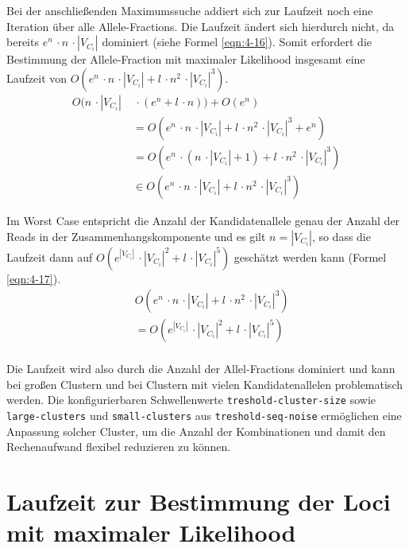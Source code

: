 Bei der anschließenden Maximumssuche addiert sich zur Laufzeit noch eine Iteration über alle Allele-Fractions. Die Laufzeit ändert sich hierdurch nicht, da bereits $e^n\, \cdotp n\, \cdotp |V_{C_{i}}|$ dominiert (siehe Formel \eqref{eqn:4-16}). Somit erfordert die Bestimmung der Allele-Fraction mit maximaler Likelihood insgesamt eine Laufzeit von $ O( e^n\, \cdotp n\, \cdotp |V_{C_{i}}| + l\, \cdotp n^2\, \cdotp |V_{C_{i}}|^3) $.
\begin{equation} \label{eqn:4-16}
\tag{4-16}
\begin{aligned}
 O( n \, \cdotp |V_{C_{i}}| &\ {} \,\cdotp (e^n + l \, \cdotp n)) + O(e^n) \\
&\ = O( e^n \, \cdotp n \, \cdotp |V_{C_{i}}| + l \, \cdotp n^2 \, \cdotp |V_{C_{i}}|^3 + e^n)\\
&\ = O( e^n \,\cdotp ( n \, \cdotp |V_{C_{i}}| + 1) + l \, \cdotp n^2 \, \cdotp |V_{C_{i}}|^3) \\
& \ \in O( e^n \, \cdotp n\, \cdotp |V_{C_{i}}| + l\, \cdotp n^2\, \cdotp |V_{C_{i}}|^3) 
\end{aligned}
\end{equation}

Im Worst Case entspricht die Anzahl der Kandidatenallele genau der Anzahl der Reads in der Zusammenhangskomponente und es gilt $ n = |V_{C_{i}}| $, so dass die Laufzeit dann auf $  O( e^{|V_{C_{i}}|} \, \cdotp  |V_{C_{i}}|^2 + l \, \cdotp |V_{C_{i}}|^5) $ geschätzt werden kann (Formel \eqref{eqn:4-17}).
\begin{equation} \label{eqn:4-17}
\tag{4-17}
\begin{aligned}
&\ {} O( e^n\, \cdotp n \, \cdotp |V_{C_{i}}| + l \, \cdotp n^2 \, \cdotp |V_{C_{i}}|^3) \\
&\ {} = O( e^{|V_{C_{i}}|} \, \cdotp  |V_{C_{i}}|^2 + l \, \cdotp |V_{C_{i}}|^5)\\
\end{aligned}
\end{equation}

Die Laufzeit wird also durch die Anzahl der Allel-Fractions dominiert und kann bei großen Clustern und bei Clustern mit vielen Kandidatenallelen problematisch werden. Die konfigurierbaren Schwellenwerte \lstinline|treshold-cluster-size| sowie \lstinline|large-clusters| und \lstinline|small-clusters| aus \lstinline|treshold-seq-noise| ermöglichen eine Anpassung solcher Cluster, um die Anzahl der Kombinationen und damit den Rechenaufwand flexibel reduzieren zu können.


\section[Laufzeit der Loci-Zuordnung]{Laufzeit zur Bestimmung der Loci mit maximaler Likelihood}

